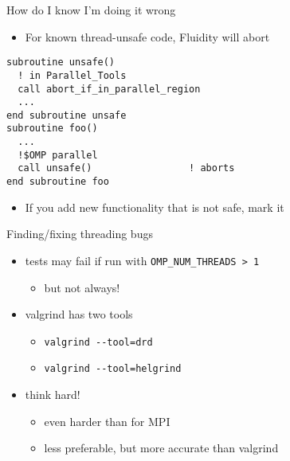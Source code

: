 \documentclass[bigger]{beamer}
\begin{document}
\begin{frame}[fragile,label={sec:orgheadline35}]{How do I know I'm doing it wrong}
 \begin{itemize}
\item For known thread-unsafe code, Fluidity will abort
\end{itemize}
\begin{verbatim}
subroutine unsafe()
  ! in Parallel_Tools
  call abort_if_in_parallel_region
  ...
end subroutine unsafe
subroutine foo()
  ...
  !$OMP parallel
  call unsafe()                 ! aborts
end subroutine foo
\end{verbatim}
\begin{itemize}
\item If you add new functionality that is not safe, mark it
\end{itemize}
\end{frame}

\begin{frame}[fragile,label={sec:orgheadline36}]{Finding/fixing threading bugs}
 \begin{itemize}
\item tests may fail if run with \texttt{OMP\_NUM\_THREADS > 1}
\begin{itemize}
\item but not always!
\end{itemize}
\item valgrind has two tools
\begin{itemize}
\item \texttt{valgrind -{}-tool=drd}
\item \texttt{valgrind -{}-tool=helgrind}
\end{itemize}
\item think hard!
\begin{itemize}
\item even harder than for MPI
\item less preferable, but more accurate than valgrind
\end{itemize}
\end{itemize}
\end{frame}
\end{document}
